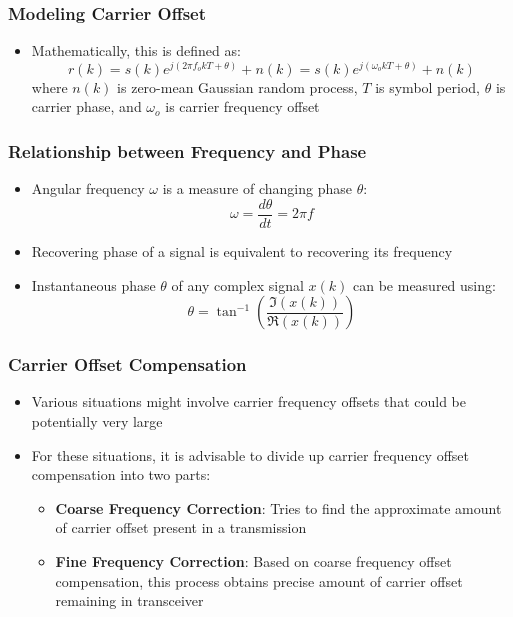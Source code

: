 \documentclass[10pt]{beamer}
\begin{document}

\frame
{
  \frametitle{Modeling Carrier Offset}

  \begin{itemize}
   \item Mathematically, this is defined as:
   \begin{equation}
    r(k)=s(k)e^{j(2\pi{f_o}kT+\theta)}+n(k)=s(k)e^{j({\omega_o}kT+\theta)}+n(k)
   \end{equation}
   where $n(k)$ is zero-mean Gaussian random process, $T$ is symbol period, $\theta$ is carrier phase, and $\omega_o$ is carrier frequency offset
  \end{itemize}

}

\frame
{
  \frametitle{Relationship between Frequency and Phase}

  \begin{itemize}
   \item Angular frequency $\omega$ is a measure of changing phase $\theta$:
   \begin{equation}
    \omega=\frac{d\theta}{dt}=2\pi{f}
   \end{equation}
   \item Recovering phase of a signal is equivalent to recovering its frequency
   \item Instantaneous phase $\theta$ of any complex signal $x(k)$ can be measured using:
   \begin{equation}
    \theta=\tan^{-1}\left(\frac{\Im(x(k))}{\Re(x(k))}\right)
   \end{equation}

  \end{itemize}

}


\frame
{
  \frametitle{Carrier Offset Compensation}

  \begin{itemize}
   \item Various situations might involve carrier frequency offsets that could be potentially very large
   \item For these situations, it is advisable to divide up carrier frequency offset compensation into two parts:
   \begin{itemize}
    \item \textbf{Coarse Frequency Correction}: Tries to find the approximate amount of carrier offset present in a transmission
    \item \textbf{Fine Frequency Correction}: Based on coarse frequency offset compensation, this process obtains precise amount of carrier offset remaining in transceiver
   \end{itemize}
  \end{itemize}

}
\end{document}

